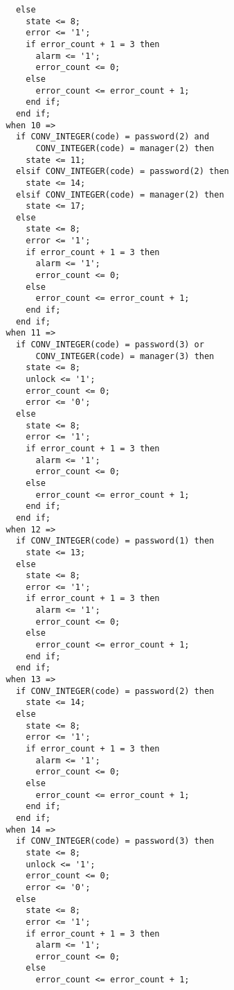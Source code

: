\documentclass[a4paper]{article}
\begin{document}
\begin{lstlisting}
            else
              state <= 8;
              error <= '1';
              if error_count + 1 = 3 then
                alarm <= '1';
                error_count <= 0;
              else
                error_count <= error_count + 1;
              end if;
            end if;
          when 10 => 
            if CONV_INTEGER(code) = password(2) and 
                CONV_INTEGER(code) = manager(2) then
              state <= 11;
            elsif CONV_INTEGER(code) = password(2) then
              state <= 14;
            elsif CONV_INTEGER(code) = manager(2) then
              state <= 17;
            else
              state <= 8;
              error <= '1';
              if error_count + 1 = 3 then
                alarm <= '1';
                error_count <= 0;
              else
                error_count <= error_count + 1;
              end if;
            end if;
          when 11 => 
            if CONV_INTEGER(code) = password(3) or 
                CONV_INTEGER(code) = manager(3) then
              state <= 8;
              unlock <= '1';
              error_count <= 0;
              error <= '0';
            else
              state <= 8;
              error <= '1';
              if error_count + 1 = 3 then
                alarm <= '1';
                error_count <= 0;
              else
                error_count <= error_count + 1;
              end if;
            end if;
          when 12 =>
            if CONV_INTEGER(code) = password(1) then
              state <= 13;
            else
              state <= 8;
              error <= '1';
              if error_count + 1 = 3 then
                alarm <= '1';
                error_count <= 0;
              else
                error_count <= error_count + 1;
              end if;
            end if;
          when 13 =>
            if CONV_INTEGER(code) = password(2) then
              state <= 14;
            else
              state <= 8;
              error <= '1';
              if error_count + 1 = 3 then
                alarm <= '1';
                error_count <= 0;
              else
                error_count <= error_count + 1;
              end if;
            end if;
          when 14 =>
            if CONV_INTEGER(code) = password(3) then
              state <= 8;
              unlock <= '1';
              error_count <= 0;
              error <= '0';
            else
              state <= 8;
              error <= '1';
              if error_count + 1 = 3 then
                alarm <= '1';
                error_count <= 0;
              else
                error_count <= error_count + 1;

\end{lstlisting}
\end{document}

